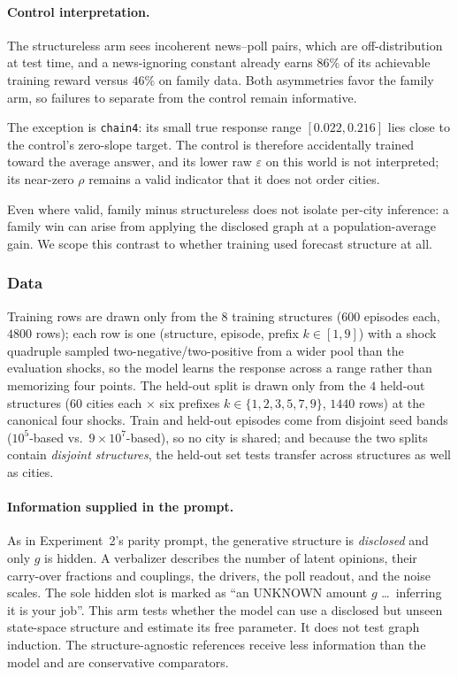 \paragraph{Control interpretation.} The structureless arm sees incoherent
news--poll pairs, which are off-distribution at test time, and a news-ignoring
constant already earns $86\%$ of its achievable training reward versus $46\%$
on family data. Both asymmetries favor the family arm, so failures to separate
from the control remain informative.

The exception is \texttt{chain4}: its small true response range
$[0.022,0.216]$ lies close to the control's zero-slope target. The control is
therefore accidentally trained toward the average answer, and its lower raw
$\varepsilon$ on this world is not interpreted; its near-zero $\rho$ remains a
valid indicator that it does not order cities.

Even where valid, family minus structureless does not isolate per-city inference:
a family win can arise from applying the disclosed graph at a population-average
gain. We scope this contrast to whether training used forecast structure at all.

\subsubsection{Data}
\label{app:exp3-data}

Training rows are drawn only from the $8$ training structures ($600$ episodes each, $4800$ rows); each row
is one (structure, episode, prefix $k\in[1,9]$) with a shock quadruple sampled two-negative/two-positive
from a wider pool than the evaluation shocks, so the model learns the response across a range rather than
memorizing four points. The held-out split is drawn only from the $4$ held-out structures ($60$ cities
each $\times$ six prefixes $k\in\{1,2,3,5,7,9\}$, $1440$ rows) at the canonical four shocks. Train and
held-out episodes come from disjoint seed bands ($10^5$-based vs.\ $9\!\times\!10^{7}$-based), so no city
is shared; and because the two splits contain \emph{disjoint structures}, the held-out set tests transfer
across structures as well as cities.

\paragraph{Information supplied in the prompt.} As in Experiment~2's parity prompt, the generative
structure is \emph{disclosed} and only $g$ is hidden. A verbalizer describes the
number of latent opinions, their carry-over fractions and couplings, the drivers,
the poll readout, and the noise scales. The sole hidden slot is marked as ``an
UNKNOWN amount $g$ \dots\ inferring it is your job''. This arm tests whether the
model can use a disclosed but unseen state-space structure and estimate its free
parameter. It does not test graph induction. The structure-agnostic references
receive less information than the model and are conservative comparators.

